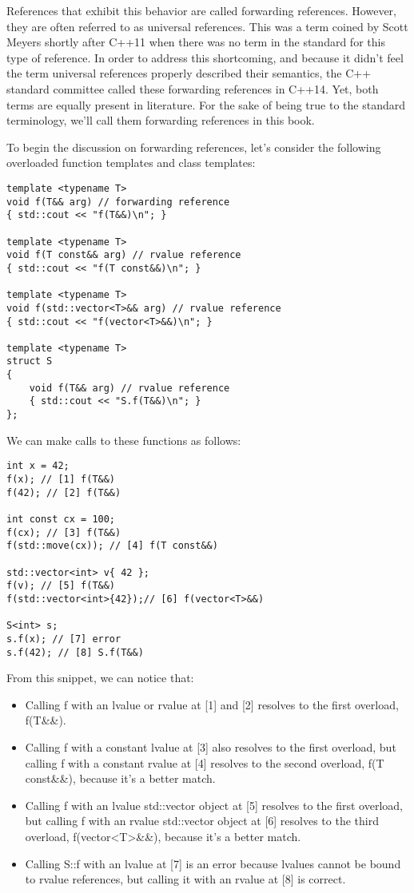 References that exhibit this behavior are called forwarding references. However, they are often referred to as universal references. This was a term coined by Scott Meyers shortly after C++11 when there was no term in the standard for this type of reference. In order to address this shortcoming, and because it didn’t feel the term universal references properly described their semantics, the C++ standard committee called these forwarding references in C++14. Yet, both terms are equally present in literature. For the sake of being true to the standard terminology, we’ll call them forwarding references in this book.

To begin the discussion on forwarding references, let’s consider the following overloaded function templates and class templates:

\begin{lstlisting}[style=styleCXX]
template <typename T>
void f(T&& arg) // forwarding reference
{ std::cout << "f(T&&)\n"; }

template <typename T>
void f(T const&& arg) // rvalue reference
{ std::cout << "f(T const&&)\n"; }

template <typename T>
void f(std::vector<T>&& arg) // rvalue reference
{ std::cout << "f(vector<T>&&)\n"; }

template <typename T>
struct S
{
	void f(T&& arg) // rvalue reference
	{ std::cout << "S.f(T&&)\n"; }
};
\end{lstlisting}

We can make calls to these functions as follows:

\begin{lstlisting}[style=styleCXX]
int x = 42;
f(x); // [1] f(T&&)
f(42); // [2] f(T&&)

int const cx = 100;
f(cx); // [3] f(T&&)
f(std::move(cx)); // [4] f(T const&&)

std::vector<int> v{ 42 };
f(v); // [5] f(T&&)
f(std::vector<int>{42});// [6] f(vector<T>&&)

S<int> s;
s.f(x); // [7] error
s.f(42); // [8] S.f(T&&)
\end{lstlisting}

From this snippet, we can notice that:

\begin{itemize}
\item
Calling f with an lvalue or rvalue at [1] and [2] resolves to the first overload, f(T\&\&).

\item
Calling f with a constant lvalue at [3] also resolves to the first overload, but calling f with a constant rvalue at [4] resolves to the second overload, f(T const\&\&), because it’s a better match.

\item
Calling f with an lvalue std::vector object at [5] resolves to the first overload, but calling f with an rvalue std::vector object at [6] resolves to the third overload, f(vector<T>\&\&), because it’s a better match.

\item
Calling S::f with an lvalue at [7] is an error because lvalues cannot be bound to rvalue references, but calling it with an rvalue at [8] is correct.
\end{itemize}

